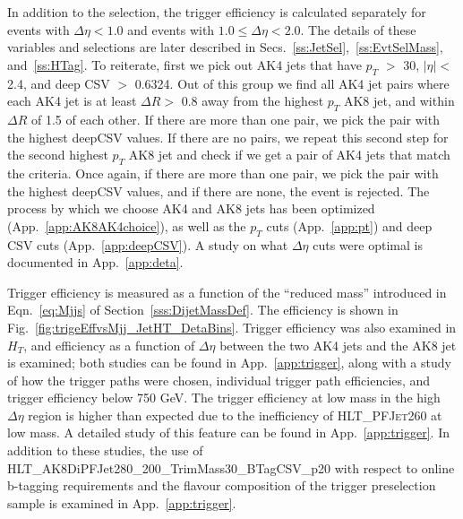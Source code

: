 In addition to the selection, the trigger efficiency is calculated separately for events with $\Delta\eta < 1.0$ and events with $1.0 \leq \Delta\eta < 2.0$. The details of these variables and selections are later described in Secs.~\ref{ss:JetSel},~\ref{ss:EvtSelMass}, and~\ref{ss:HTag}. To reiterate, first we pick out AK4 jets that have $p_{T}$ $>$ 30, $|\eta| <$ 2.4, and deep CSV $>$ 0.6324. Out of this group we find all AK4 jet pairs where each AK4 jet is at least $\Delta R >$ 0.8 away from the highest $p_{T}$ AK8 jet, and within $\Delta R$ of 1.5 of each other. If there are more than one pair, we pick the pair with the highest deepCSV values. If there are no pairs, we repeat this second step for the second highest $p_{T}$ AK8 jet and check if we get a pair of AK4 jets that match the criteria. Once again, if there are more than one pair, we pick the pair with the highest deepCSV values, and if there are none, the event is rejected. The process by which we choose AK4 and AK8 jets has been optimized (App.~\ref{app:AK8AK4choice}), as well as the $p_{T}$ cuts (App.~\ref{app:pt}) and deep CSV cuts (App.~\ref{app:deepCSV}). A study on what $\Delta\eta$ cuts were optimal is documented in App.~\ref{app:deta}. 

Trigger efficiency is measured as a function of the ``reduced mass'' introduced in Eqn.~\ref{eq:Mjjs} of Section~\ref{sss:DijetMassDef}. The efficiency is shown in Fig.~\ref{fig:trigeEffvsMjj_JetHT_DetaBins}. Trigger efficiency was also examined in $H_{T}$, and efficiency as a function of $\Delta\eta$ between the two AK4 jets and the AK8 jet is examined; both studies can be found in App.~\ref{app:trigger}, along with a study of how the trigger paths were chosen, individual trigger path efficiencies, and trigger efficiency below 750 GeV. The trigger efficiency at low mass in the high $\Delta\eta$ region is higher than expected due to the inefficiency of \textsc{HLT\_PFJet260} at low mass. A detailed study of this feature can be found in App.~\ref{app:trigger}. In addition to these studies, the use of HLT\_AK8DiPFJet280\_200\_TrimMass30\_BTagCSV\_p20 with respect to online b-tagging requirements and the flavour composition of the trigger preselection sample is examined in App.~\ref{app:trigger}.

